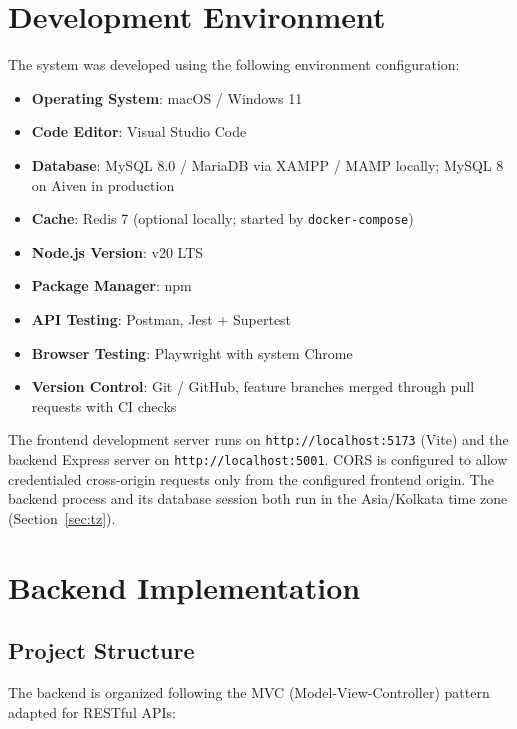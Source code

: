 \FloatBarrier
\section{Development Environment}

The system was developed using the following environment configuration:

\begin{itemize}
    \item \textbf{Operating System}: macOS / Windows 11
    \item \textbf{Code Editor}: Visual Studio Code
    \item \textbf{Database}: MySQL 8.0 / MariaDB via XAMPP / MAMP locally; MySQL 8 on Aiven in production
    \item \textbf{Cache}: Redis 7 (optional locally; started by \texttt{docker-compose})
    \item \textbf{Node.js Version}: v20 LTS
    \item \textbf{Package Manager}: npm
    \item \textbf{API Testing}: Postman, Jest + Supertest
    \item \textbf{Browser Testing}: Playwright with system Chrome
    \item \textbf{Version Control}: Git / GitHub, feature branches merged through pull requests with CI checks
\end{itemize}

The frontend development server runs on \texttt{http://localhost:5173} (Vite) and the backend Express server on \texttt{http://localhost:5001}. CORS is configured to allow credentialed cross-origin requests only from the configured frontend origin. The backend process and its database session both run in the Asia/Kolkata time zone (Section~\ref{sec:tz}).

\FloatBarrier
\section{Backend Implementation}

\FloatBarrier
\subsection{Project Structure}

The backend is organized following the MVC (Model-View-Controller) pattern adapted for RESTful APIs:

